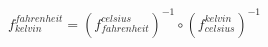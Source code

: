 $ f_{kelvin}^{fahrenheit} = {(f_{fahrenheit}^{celsius})^{-1}} \circ {(f_{celsius}^{kelvin})^{-1}} $
